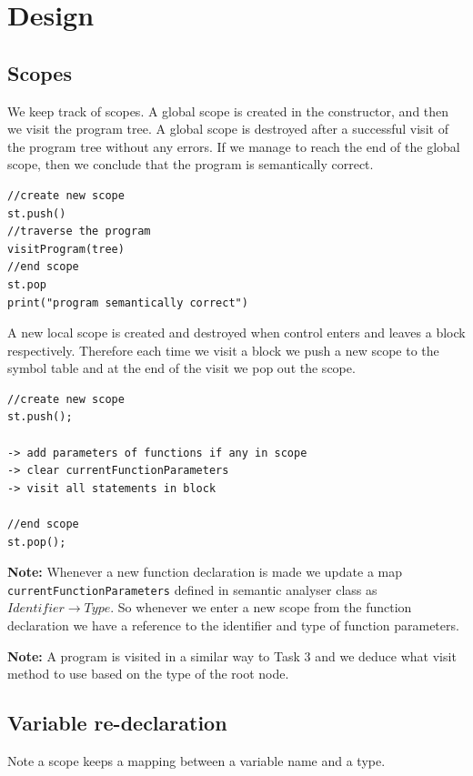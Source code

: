 \section{Design}
\label{sec:design semantic}
\subsection{Scopes}
We keep track of scopes. A global scope is created in the constructor, and then we visit the program tree. A global scope is destroyed after a successful visit of the program tree without any errors. If we manage to reach the end of the global scope, then we conclude that the program is semantically correct.
\begin{lstlisting}[caption=PSEUDOCODE : constructor (start of program traversal)]
//create new scope 
st.push()
//traverse the program
visitProgram(tree)
//end scope
st.pop
print("program semantically correct")
\end{lstlisting}

A new local scope is created  and destroyed when control enters and leaves a block respectively. Therefore each time we visit a block we push a new scope to the symbol table and at the end of the visit we pop out the scope.
\begin{lstlisting}[caption=PSEUDOCODE : \emph{visitBlockNode(Tree tree)}]
//create new scope
st.push();

-> add parameters of functions if any in scope
-> clear currentFunctionParameters
-> visit all statements in block

//end scope
st.pop();
\end{lstlisting}

\textbf{Note:} Whenever a new function declaration is made we update a map  \verb!currentFunctionParameters! defined in semantic analyser class as $Identifier \rightarrow Type$. So whenever we enter a new scope from the function declaration we have a reference to the identifier and type of function parameters.

\textbf{Note:} A program is visited in a similar way to Task 3 and we  deduce what visit method to use based on the  type of the root node. 


\subsection{Variable re-declaration}
Note a scope keeps a mapping between a variable name and a type. 






